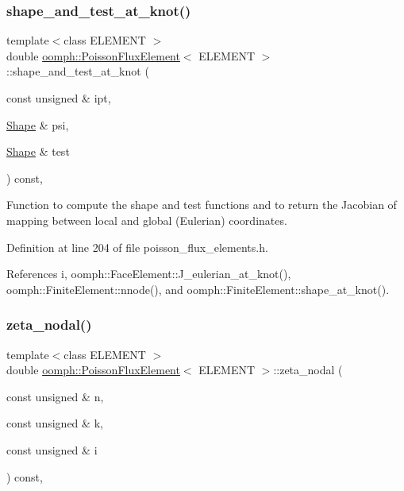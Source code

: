 \subsubsection{\texorpdfstring{shape\+\_\+and\+\_\+test\+\_\+at\+\_\+knot()}{shape\_and\_test\_at\_knot()}}
{\footnotesize\ttfamily template$<$class E\+L\+E\+M\+E\+NT $>$ \\
double \hyperlink{classoomph_1_1PoissonFluxElement}{oomph\+::\+Poisson\+Flux\+Element}$<$ E\+L\+E\+M\+E\+NT $>$\+::shape\+\_\+and\+\_\+test\+\_\+at\+\_\+knot (\begin{DoxyParamCaption}\item[{const unsigned \&}]{ipt,  }\item[{\hyperlink{classoomph_1_1Shape}{Shape} \&}]{psi,  }\item[{\hyperlink{classoomph_1_1Shape}{Shape} \&}]{test }\end{DoxyParamCaption}) const\hspace{0.3cm}{\ttfamily [inline]}, {\ttfamily [protected]}}



Function to compute the shape and test functions and to return the Jacobian of mapping between local and global (Eulerian) coordinates. 



Definition at line 204 of file poisson\+\_\+flux\+\_\+elements.\+h.



References i, oomph\+::\+Face\+Element\+::\+J\+\_\+eulerian\+\_\+at\+\_\+knot(), oomph\+::\+Finite\+Element\+::nnode(), and oomph\+::\+Finite\+Element\+::shape\+\_\+at\+\_\+knot().

\mbox{\label{classoomph_1_1PoissonFluxElement_acf4651fa89a7f6c5a23c1960423dc8e6}} 
\subsubsection{\texorpdfstring{zeta\+\_\+nodal()}{zeta\_nodal()}}
{\footnotesize\ttfamily template$<$class E\+L\+E\+M\+E\+NT $>$ \\
double \hyperlink{classoomph_1_1PoissonFluxElement}{oomph\+::\+Poisson\+Flux\+Element}$<$ E\+L\+E\+M\+E\+NT $>$\+::zeta\+\_\+nodal (\begin{DoxyParamCaption}\item[{const unsigned \&}]{n,  }\item[{const unsigned \&}]{k,  }\item[{const unsigned \&}]{i }\end{DoxyParamCaption}) const\hspace{0.3cm}{\ttfamily [inline]}, {\ttfamily [virtual]}}



